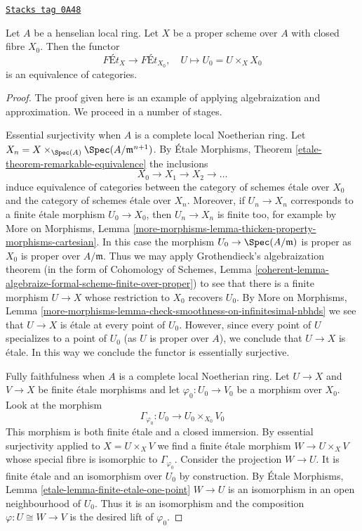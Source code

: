 \begin{lemma}
\label{pione-lemma-finite-etale-on-proper-over-henselian}
\href{https://stacks.math.columbia.edu/tag/0A48}{\texttt{Stacks tag 0A48}}

Let $A$ be a henselian local ring. Let $X$ be a proper scheme over $A$
with closed fibre $X_0$. Then the functor
$$
\textit{F\'Et}_X \to \textit{F\'Et}_{X_0},\quad
U \longmapsto U_0 = U \times_X X_0
$$
is an equivalence of categories.
\end{lemma}

\begin{proof}
The proof given here is an example of applying algebraization and
approximation. We proceed in a number of stages.

\medskip\noindent
Essential surjectivity when $A$ is a complete local Noetherian ring.
Let $X_n = X \times_{\Spec(A)} \Spec(A/\mathfrak m^{n + 1})$.
By \'Etale Morphisms, Theorem \ref{etale-theorem-remarkable-equivalence}
the inclusions
$$
X_0 \to X_1 \to X_2 \to \ldots
$$
induce equivalence of categories between the category
of schemes \'etale over $X_0$ and the category of schemes
\'etale over $X_n$.
Moreover, if $U_n \to X_n$ corresponds to a finite \'etale
morphism $U_0 \to X_0$, then $U_n \to X_n$ is finite too, for example
by More on Morphisms, Lemma
\ref{more-morphisms-lemma-thicken-property-morphisms-cartesian}.
In this case the morphism $U_0 \to \Spec(A/\mathfrak m)$
is proper as $X_0$ is proper over $A/\mathfrak m$. Thus we may apply
Grothendieck's algebraization theorem
(in the form of
Cohomology of Schemes, Lemma
\ref{coherent-lemma-algebraize-formal-scheme-finite-over-proper})
to see that there is a finite morphism $U \to X$ whose restriction
to $X_0$ recovers $U_0$. By More on Morphisms, Lemma
\ref{more-morphisms-lemma-check-smoothness-on-infinitesimal-nbhds}
we see that $U \to X$ is \'etale at every point of $U_0$.
However, since every point of $U$ specializes to a point of $U_0$
(as $U$ is proper over $A$), we conclude that $U \to X$ is \'etale.
In this way we conclude the functor is essentially surjective.

\medskip\noindent
Fully faithfulness when $A$ is a complete local Noetherian ring.
Let $U \to X$ and $V \to X$ be finite \'etale morphisms and
let $\varphi_0 : U_0 \to V_0$ be a morphism over $X_0$. Look at
the morphism
$$
\Gamma_{\varphi_0} : U_0 \longrightarrow U_0 \times_{X_0} V_0
$$
This morphism is both finite \'etale and a closed immersion.
By essential surjectivity applied to $X = U \times_X V$ we find
a finite \'etale morphism $W \to U \times_X V$ whose special
fibre is isomorphic to $\Gamma_{\varphi_0}$. Consider the projection
$W \to U$. It is finite \'etale and an isomorphism over $U_0$ by
construction. By \'Etale Morphisms, Lemma
\ref{etale-lemma-finite-etale-one-point}
$W \to U$ is an isomorphism in an open neighbourhood of $U_0$.
Thus it is an isomorphism and the composition $\varphi : U \cong W \to V$
is the desired lift of $\varphi_0$.


\end{proof}
